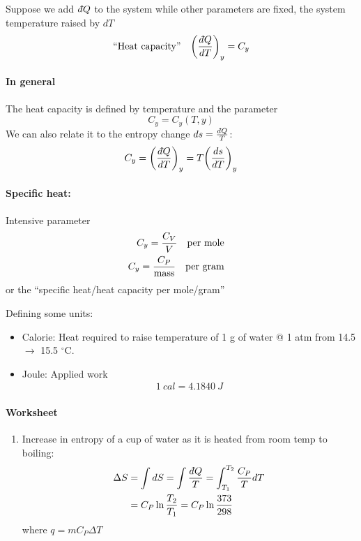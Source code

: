 \documentclass[../main.tex]{subfiles}
\begin{document}
Suppose we add $d\hspace*{-0.08em}\bar{}\hspace*{0.1em} Q$ to the system while other parameters are fixed, the system temperature raised by $dT$ 
\[ \textrm{``Heat capacity''} \quad \qt(\frac{\dbar Q}{dT})_y = C_y \]

\paragraph{In general} The heat capacity is defined by temperature and the parameter
\[ C_y = C_y(T, y) \]
We can also relate it to the entropy change $ds = \frac{d\hspace*{-0.08em}\bar{}\hspace*{0.1em} Q}{T}$:
\begin{align*}
    C_y = \qt(\frac{\dbar Q}{dT})_y = T \qt(\frac{ds}{dT})_y
\end{align*}

\paragraph{Specific heat:} Intensive parameter
\begin{align*}
    C_y = \frac{C_V}{V} \qqtext{per mole} \\
    C_y = \frac{C_P}{\text{mass}} \qqtext{per gram}
\end{align*}
or the ``specific heat/heat capacity per mole/gram''

Defining some units:
\begin{itemize}
    \item Calorie: Heat required to raise temperature of 1 g of water @ 1 atm from 14.5 $\to$ 15.5 $^\circ$C.
    \item Joule: Applied work
    \begin{align*}
        \qty{1}{cal} = \qty{4.1840}{J}
    \end{align*}
\end{itemize}

\paragraph{Worksheet}
\begin{enumerate}
    \item Increase in entropy of a cup of water as it is heated from room temp to boiling:
    \begin{align*}
        \Delta S &= \int dS = \int \frac{d\hspace*{-0.08em}\bar{}\hspace*{0.1em} Q}{T} = \int_{T_1}^{T_2} \frac{C_P}{T} dT \\
        &= C_P \ln \frac{T_2}{T_1} = C_P \ln \frac{373}{298}
    \end{align*}
    where $q = m C_P \Delta T$
\end{enumerate}
\end{document}
